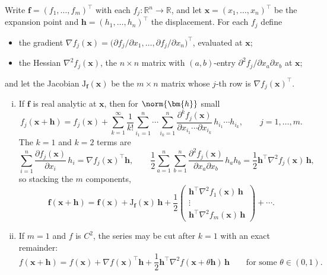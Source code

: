 \begin{theorem}
    \label{thm:taylor}
    Write \(\bm{f} = (f_1, \dots, f_m)^\top\) with each \(f_j \colon
    \mathbb{R}^n \to \mathbb{R}\), and let \(\bm{x} = (x_1, \dots, x_n)^\top\)
    be the expansion point and \(\bm{h} = (h_1, \dots, h_n)^\top\) the
    displacement. For each \(f_j\) define
    \begin{itemize}
        \item the gradient \(\nabla f_j(\bm{x}) = \bigl( \partial f_j /
            \partial x_1, \dots, \partial f_j / \partial x_n \bigr)^\top\),
            evaluated at \(\bm{x}\);
        \item the Hessian \(\nabla^2 f_j(\bm{x})\), the \(n \times n\) matrix
            with \((a, b)\)-entry \(\partial^2 f_j / \partial x_a \partial
            x_b\) at \(\bm{x}\);
    \end{itemize}
    and let the Jacobian \(\mathrm{J}_{\bm{f}}(\bm{x})\) be the \(m \times n\)
    matrix whose \(j\)-th row is \(\nabla f_j(\bm{x})^\top\).
    \begin{enumerate}[(i)]
        \item If \(\bm{f}\) is real analytic at \(\bm{x}\), then for
            \(\norm{\bm{h}}\) small
            \[
                f_j(\bm{x} + \bm{h}) = f_j(\bm{x}) + \sum_{k=1}^{\infty}
                \frac{1}{k!} \sum_{i_1 = 1}^{n} \cdots \sum_{i_k = 1}^{n}
                \frac{\partial^k f_j (\bm{x})}{\partial x_{i_1} \cdots
                \partial x_{i_k}} \, h_{i_1} \cdots h_{i_k} , \qquad j = 1,
                \dots, m .
            \]
            The \(k = 1\) and \(k = 2\) terms are
            \[
                \sum_{i = 1}^{n} \frac{\partial f_j(\bm{x})}{\partial x_i} \,
                h_i = \nabla f_j(\bm{x})^\top \bm{h} , \qquad
                \frac{1}{2} \sum_{a = 1}^{n} \sum_{b = 1}^{n} \frac{\partial^2
                f_j(\bm{x})}{\partial x_a \partial x_b} \, h_a h_b =
                \frac{1}{2} \bm{h}^\top \nabla^2 f_j(\bm{x}) \, \bm{h} ,
            \]
            so stacking the \(m\) components,
            \[
                \bm{f}(\bm{x} + \bm{h}) = \bm{f}(\bm{x}) +
                \mathrm{J}_{\bm{f}}(\bm{x}) \, \bm{h} + \frac{1}{2}
                \begin{pmatrix}
                    \bm{h}^\top \nabla^2 f_1(\bm{x}) \, \bm{h}\\
                    \vdots\\
                    \bm{h}^\top \nabla^2 f_m(\bm{x}) \, \bm{h}
                \end{pmatrix}
                + \cdots .
            \]
        \item If \(m = 1\) and \(f\) is \(C^2\), the series may be cut after
            \(k = 1\) with an exact remainder:
            \[
                f(\bm{x} + \bm{h}) = f(\bm{x}) + \nabla f(\bm{x})^\top \bm{h}
                + \frac{1}{2} \bm{h}^\top \nabla^2 f(\bm{x} + \theta \bm{h})
                \, \bm{h} \qquad \text{for some } \theta \in (0, 1) .
            \]
    \end{enumerate}
\end{theorem}

